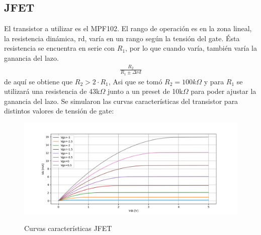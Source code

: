 \subsection{JFET}
El transistor a utilizar es el MPF102. El rango de operación es en la zona lineal, la resistencia dinámica, rd, varía en un rango según la tensión del gate. Ésta resistencia se encuentra en
serie con $R_1$, por lo que cuando varía, también varía la ganancia del lazo.
\begin{align}
\frac{R_2}{R_1 \pm \Delta rd}
\end{align}
de aquí se obtiene que $R_2>2\cdot R_1$, Asi que se tomó $R_2=100k\Omega$ y para $R_1$ se utilizará una resistencia de 43k$\Omega$ junto a un preset de 10k$\Omega$ para poder ajustar la ganancia del lazo.
Se simularon las curvas características del transistor para distintos valores de tensión de gate:
\begin{figure}[H]
	\centering
	\includegraphics[width=\textwidth]{Imagenes-Ej1/curvasJfet.png}
	\label{fig:caracdcurv}
	\caption{Curvas características JFET}
\end{figure}

